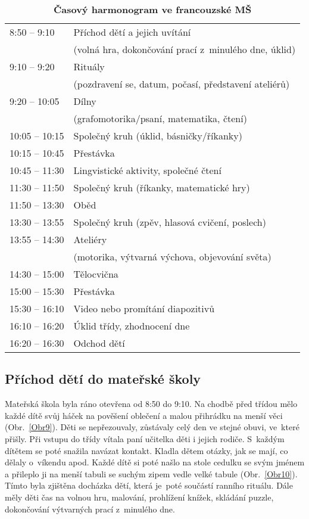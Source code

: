 \begin{spacing}{1.0}
	\begin{table}[h!]
		\center
		\begin{tabular}{|l l|}
			\hline
			\rowcolor{grey!0}
			8:50 – 9:10 		& Příchod dětí a jejich uvítání 						\\
								& (volná hra, dokončování prací z minulého dne, úklid) 	\\
			9:10 – 9:20			& Rituály 												\\
								& (pozdravení se, datum, počasí, představení ateliérů) 	\\
			9:20 – 10:05		& Dílny 												\\
								& (grafomotorika/psaní, matematika, čtení) 				\\
			10:05 – 10:15		& Společný kruh (úklid, básničky/říkanky) 				\\
			10:15 – 10:45		& Přestávka 											\\
			10:45 – 11:30		& Lingvistické aktivity, společné čtení 				\\
			11:30 – 11:50		& Společný kruh (říkanky, matematické hry) 				\\
			11:50 – 13:30		& Oběd 													\\
			13:30 – 13:55		& Společný kruh (zpěv, hlasová cvičení, poslech) 		\\
			13:55 – 14:30		& Ateliéry 												\\
								&(motorika, výtvarná výchova, objevování světa) 		\\
			14:30 – 15:00		& Tělocvična 											\\
			15:00 – 15:30		& Přestávka 											\\
			15:30 – 16:10		& Video nebo promítání diapozitivů 						\\
			16:10 – 16:20		& Úklid třídy, zhodnocení dne 							\\
			16:20 – 16:30		& Odchod dětí 											\\
			\hline
		\end{tabular}
		\caption{ \textbf{Časový harmonogram ve francouzské MŠ}	
		}
		\label{tab:rezimDneFR}
	\end{table}
	\end{spacing}

		\subsection{Příchod dětí do mateřské školy}
		\label{prichod}
			Mateřská škola byla ráno otevřena od 8:50 do 9:10. Na chodbě před třídou mělo každé dítě svůj háček na pověšení oblečení a malou přihrádku na menší věci (Obr.~\ref{Obr9}). Děti se nepřezouvaly, zůstávaly celý den ve stejné obuvi, ve které přišly. Při vstupu do třídy vítala paní učitelka děti i jejich rodiče. S každým dítětem se poté snažila navázat kontakt. Kladla dětem otázky, jak se mají, co dělaly o~víkendu apod. Každé dítě si poté našlo na stole cedulku se svým jménem a přileplo ji na menší tabuli se suchým zipem vedle velké tabule (Obr.~\ref{Obr10}). Tímto byla zjištěna docházka dětí, která je poté součástí ranního rituálu. Dále měly děti čas na volnou hru, malování, prohlížení knížek, skládání puzzle, dokončování výtvarných prací z minulého dne.
		

